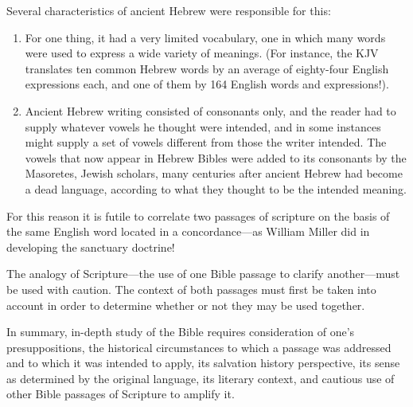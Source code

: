 Several characteristics of ancient Hebrew were responsible for this:
\begin{enumerate}
    \item For
one thing, it had a very limited vocabulary, one in which many words were
used to express a wide variety of meanings. (For instance, the KJV
translates ten common Hebrew words by an average of eighty-four English
expressions each, and one of them by 164 English words and
expressions!\cite{64}). 
    \item Ancient Hebrew writing consisted of consonants only,
and the reader had to supply whatever vowels he thought were intended, and
in some instances might supply a set of vowels different from those the
writer intended. The vowels that now appear in Hebrew Bibles were added to
its consonants by the Masoretes, Jewish scholars, many centuries after
ancient Hebrew had become a dead language, according to what they thought to
be the intended meaning.
\end{enumerate}
For this reason it is futile to correlate two
passages of scripture on the basis of the same English word located in a
concordance---as William Miller did in developing the sanctuary doctrine! 

The analogy of Scripture---the use of one Bible passage to clarify
another---must be used with caution. 
The context of both passages must 
first be taken into account in order to determine whether or not they may be
used together.

In summary, in-depth study of the Bible requires consideration of one's
presuppositions, the historical circumstances to which a passage was
addressed and to which it was intended to apply, its salvation history
perspective, its sense as determined by the original language, its literary
context, and cautious use of other Bible passages of Scripture to amplify
it.

